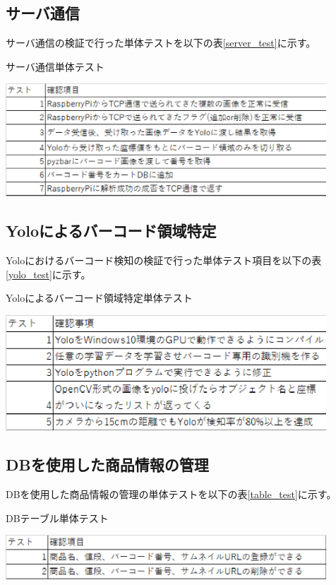 \subsection*{サーバ通信}
サーバ通信の検証で行った単体テストを以下の表\ref{server_test}に示す。
\begin{table}[htbp]
\centering
\caption{サーバ通信単体テスト}
\includegraphics[width=12cm]{./pic/server_test.eps}
\label{server_test}
\end{table}

\subsection*{Yoloによるバーコード領域特定}
Yoloにおけるバーコード検知の検証で行った単体テスト項目を以下の表\ref{yolo_test}に示す。
\begin{table}[htbp]
\centering
\caption{Yoloによるバーコード領域特定単体テスト}
\includegraphics[width=12cm]{./pic/yolo_test.eps}
\label{yolo_test}
\end{table}

\subsection*{DBを使用した商品情報の管理}
DBを使用した商品情報の管理の単体テストを以下の表\ref{table_test}に示す。

\begin{table}[htbp]
\centering
\caption{DBテーブル単体テスト}
\includegraphics[width=12cm]{./pic/table_test.eps}
\label{table_test}
\end{table}


